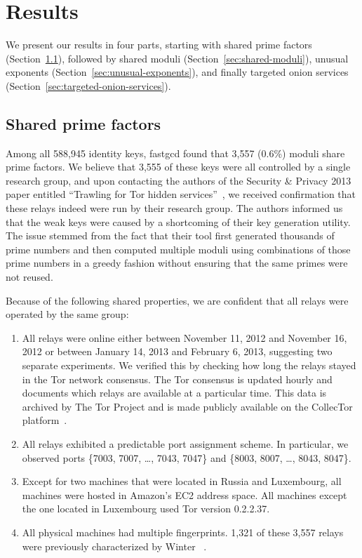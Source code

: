 \section{Results}
\label{sec:results}
We present our results in four parts, starting with shared prime factors
(Section~\ref{sec:shared-primes}), followed by shared moduli
(Section~\ref{sec:shared-moduli}), unusual exponents 
(Section~\ref{sec:unusual-exponents}), and finally targeted onion services
(Section~\ref{sec:targeted-onion-services}).

\subsection{Shared prime factors}
\label{sec:shared-primes}
Among all 588,945 identity keys, fastgcd found that 3,557 (0.6\%)
moduli share prime factors.  We believe that 3,555 of these keys were all
controlled by a single research group, and upon contacting the authors of the
Security \& Privacy 2013 paper entitled ``Trawling for Tor hidden
services''~\cite{Biryukov2013a}, we received confirmation that these relays
indeed were run by their research group.  The authors informed us that the weak
keys were caused by a shortcoming of their key generation utility. The issue
stemmed from the fact that their tool first generated thousands of prime numbers
and then computed multiple moduli using combinations of those prime numbers in a
greedy fashion without ensuring that the same primes were not reused.

Because of the following shared properties, we are confident that all relays
were operated by the same group:

\begin{enumerate}
	\item All relays were online either between November 11, 2012 and
		November 16, 2012 or between January 14, 2013 and February 6, 2013,
		suggesting two separate experiments. We verified this by checking how
		long the relays stayed in the Tor network consensus. The Tor consensus
		is updated hourly and documents which relays are available at a
		particular time. This data is archived by The Tor Project and is made
		publicly available on the CollecTor platform~\cite{collector}.

	\item All relays exhibited a predictable port assignment scheme.  In
		particular, we observed ports \{7003, 7007, \dots, 7043, 7047\} and
		\{8003, 8007, \dots, 8043, 8047\}.

	\item Except for two machines that were located in Russia and Luxembourg,
		all machines were hosted in Amazon's EC2 address space.  All machines
		except the one located in Luxembourg used Tor version 0.2.2.37.

	\item All physical machines had multiple fingerprints.  1,321 of these 3,557
		relays were previously characterized by Winter
		\ea~\cite[\S~5.1]{Winter2016a}.
\end{enumerate}

